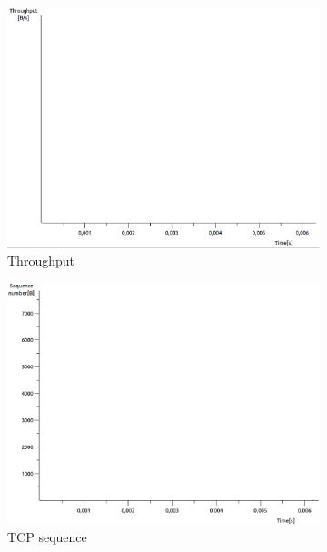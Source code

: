 \documentclass[conference,a4paper]{../../sty/IEEEtran}
\begin{document}
\begin{figure}
 \centering
 \begin{subfigure}[b]{0.2\textwidth}
  \includegraphics[width=\textwidth]{s8-3_th}
  \caption{Throughput}
 \end{subfigure}
 \begin{subfigure}[b]{0.2\textwidth}
  \includegraphics[width=\textwidth]{s8-3_seq}
  \caption{TCP sequence}
 \end{subfigure}
 \begin{subfigure}[b]{0.2\textwidth}

\end{subfigure}
\end{figure}
\end{document}
